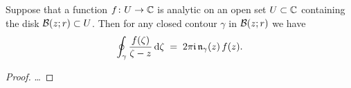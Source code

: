 \begin{theorem}
  \label{thm:CAUCHY_FORMULA}
  Suppose that a function $f \colon U \to \bC$ is analytic on an open
  set $U \subset \bC$ containing the disk $\DiskRC{r}{z} \subset U$.
  Then for any closed contour $\gamma$ in $\DiskRC{r}{z}$ we have
  \begin{align*}
    \oint_\gamma \frac{f(\zeta)}{\zeta - z} \, \ud \zeta
    \; = \; 2\pi \ii \, \windN{\gamma}{z} \, f(z) .
  \end{align*}
\end{theorem}
\begin{proof}
  \ldots
\end{proof}
